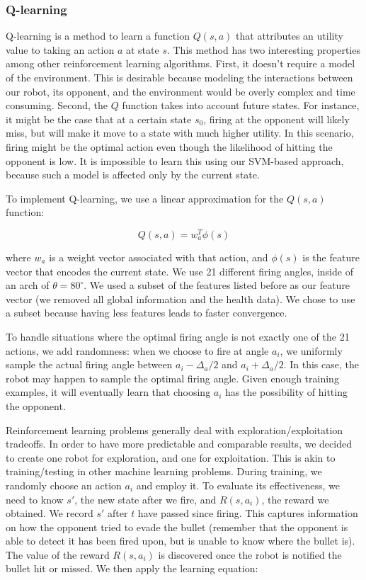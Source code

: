 \documentclass{article}
\theoremstyle{plain}
\theoremstyle{definition}
\theoremstyle{remark}
\begin{document}
\subsubsection*{Q-learning}
Q-learning \cite{watkins92a} is a method to learn a function $Q(s, a)$ that attributes an utility value to taking an action $a$ at state $s$. This method has two interesting properties among other reinforcement learning algorithms. First, it doesn't require a model of the environment. This is desirable because modeling the interactions between our robot, its opponent, and the environment would be overly complex and time consuming. Second, the $Q$ function takes into account future states. For instance, it might be the case that at a certain state $s_0$, firing at the opponent will likely miss, but will make it move to a state with much higher utility. In this scenario, firing might be the optimal action even though the likelihood of hitting the opponent is low. It is impossible to learn this using our SVM-based approach, because such a model is affected only by the current state.

To implement Q-learning, we use a linear approximation for the $Q(s, a)$ function:

$$Q(s, a) = w_a^T\phi(s)$$

where $w_a$ is a weight vector associated with that action, and $\phi(s)$ is the feature vector that encodes the current state. We use 21 different firing angles, inside of an arch of $\theta = 80^{\circ}$. We used a subset of the features listed before as our feature vector (we removed all global information and the health data). We chose to use a subset because having less features leads to faster convergence.

To handle situations where the optimal firing angle is not exactly one of the 21 actions, we add randomness: when we choose to fire at angle $a_i$, we uniformly sample the actual firing angle between $a_i - \Delta_a/2$ and $a_i + \Delta_a/2$. In this case, the robot may happen to sample the optimal firing angle. Given enough training examples, it will eventually learn that choosing $a_i$ has the possibility of hitting the opponent.

Reinforcement learning problems generally deal with exploration/exploitation tradeoffs. In order to have more predictable and comparable results, we decided to create one robot for exploration, and one for exploitation. This is akin to training/testing in other machine learning problems. During training, we randomly choose an action $a_i$ and employ it. To evaluate its effectiveness, we need to know $s'$, the new state after we fire, and $R(s, a_i)$, the reward we obtained. We record $s'$ after $t$ have passed since firing. This captures information on how the opponent tried to evade the bullet (remember that the opponent is able to detect it has been fired upon, but is unable to know where the bullet is). The value of the reward $R(s, a_i)$ is discovered once the robot is notified the bullet hit or missed. We then apply the learning equation\cite{russelnorvig}:
\end{document}
